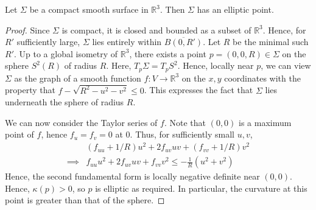 \documentclass[a4paper,11pt]{article}
\begin{document}
\begin{proposition}
	Let \( \Sigma \) be a compact smooth surface in \( \mathbb R^3 \).
	Then \( \Sigma \) has an elliptic point.
\end{proposition}
\begin{proof}
	Since \( \Sigma \) is compact, it is closed and bounded as a subset of \( \mathbb R^3 \).
	Hence, for \( R' \) sufficiently large, \( \Sigma \) lies entirely within \( \overline{B(0,R')} \).
	Let \( R \) be the minimal such \( R' \).
	Up to a global isometry of \( \mathbb R^3 \), there exists a point \( p = (0,0,R) \in \Sigma \) on the sphere \( S^2(R) \) of radius \( R \).
	Here, \( T_p \Sigma = T_p S^2 \).
	Hence, locally near \( p \), we can view \( \Sigma \) as the graph of a smooth function \( f \colon V \to \mathbb R^3 \) on the \( x, y \) coordinates with the property that \( f - \sqrt{R^2 - u^2 - v^2} \leq 0 \).
	This expresses the fact that \( \Sigma \) lies underneath the sphere of radius \( R \).

	We can now consider the Taylor series of \( f \).
	Note that \( (0,0) \) is a maximum point of \( f \), hence \( f_u = f_v = 0 \) at \( 0 \).
	Thus, for sufficiently small \( u,v \),
	\[
		\begin{aligned}
			& (f_{uu} + 1/R) u^2 + 2f_{uv} uv + (f_{vv} + 1/R) v^2 \\ 
			\implies & f_{uu} u^2 + 2f_{uv} uv + f_{vv} v^2  \leq - \frac{1}{R} (u^2 + v^2)
		\end{aligned}
	\]
	Hence, the second fundamental form is locally negative definite near \( (0,0) \).
	Hence, \( \kappa(p) > 0 \), so \( p \) is elliptic as required.
	In particular, the curvature at this point is greater than that of the sphere.
\end{proof}
\end{document}
